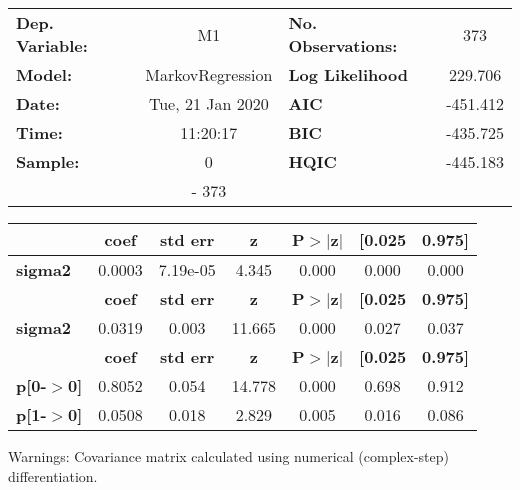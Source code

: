 \begin{center}
\begin{tabular}{lclc}
\toprule
\textbf{Dep. Variable:} &        M1        & \textbf{  No. Observations:  } &    373      \\
\textbf{Model:}         & MarkovRegression & \textbf{  Log Likelihood     } &  229.706    \\
\textbf{Date:}          & Tue, 21 Jan 2020 & \textbf{  AIC                } &  -451.412   \\
\textbf{Time:}          &     11:20:17     & \textbf{  BIC                } &  -435.725   \\
\textbf{Sample:}        &        0         & \textbf{  HQIC               } &  -445.183   \\
\textbf{}               &       - 373      & \textbf{                     } &             \\
\bottomrule
\end{tabular}
\begin{tabular}{lcccccc}
                & \textbf{coef} & \textbf{std err} & \textbf{z} & \textbf{P$>$$|$z$|$} & \textbf{[0.025} & \textbf{0.975]}  \\
\midrule
\textbf{sigma2} &       0.0003  &     7.19e-05     &     4.345  &         0.000        &        0.000    &        0.000     \\
                & \textbf{coef} & \textbf{std err} & \textbf{z} & \textbf{P$>$$|$z$|$} & \textbf{[0.025} & \textbf{0.975]}  \\
\midrule
\textbf{sigma2} &       0.0319  &        0.003     &    11.665  &         0.000        &        0.027    &        0.037     \\
                   & \textbf{coef} & \textbf{std err} & \textbf{z} & \textbf{P$>$$|$z$|$} & \textbf{[0.025} & \textbf{0.975]}  \\
\midrule
\textbf{p[0-$>$0]} &       0.8052  &        0.054     &    14.778  &         0.000        &        0.698    &        0.912     \\
\textbf{p[1-$>$0]} &       0.0508  &        0.018     &     2.829  &         0.005        &        0.016    &        0.086     \\
\bottomrule
\end{tabular}
\end{center}

Warnings: \newline
 [1] Covariance matrix calculated using numerical (complex-step) differentiation.